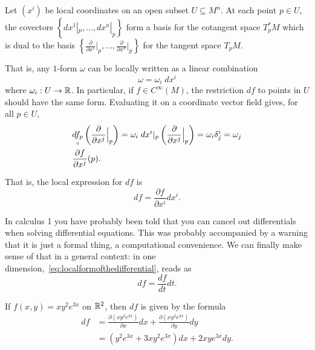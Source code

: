 \begin{proposition}
	Let $(x^i)$ be local coordinates on an open subset $U\subseteq M^n$.
	At each point $p\in U$, the covectors $\left\{dx^1|_p, \ldots, dx^n|_p\right\}$ form a basis for the cotangent space $T_p^* M$ which is dual to the basis $\left\{\frac{\partial}{\partial x^1}\Big|_p, \ldots, \frac{\partial}{\partial x^n}\Big|_p\right\}$ for the tangent space $T_p M$.
\end{proposition}

That is, any $1$-form $\omega$ can be locally written as a linear combination
\begin{equation}
	\omega = \omega_i\; dx^i
\end{equation}
where $\omega_i:U\to\mathbb{R}$.
In particular, if $f\in C^\infty(M)$, the restriction $df$ to points in $U$ should have the same form.
Evaluating it on a coordinate vector field gives, for all $p\in U$,
\begin{align}
	 & \underset{\shortparallel}{df_p} \left(\frac{\partial}{\partial x^j}\Big|_p\right)
	= \omega_i\; dx^i|_p \left(\frac{\partial}{\partial x^j}\Big|_p\right) =
	\omega_i \delta^i_j = \omega_j                                                       \\
	 & \frac{\partial f}{\partial x^j}(p).
\end{align}

That is, the local expression for $df$ is
\begin{equation}\label{eq:localformofthedifferential}
	df =  \frac{\partial f}{\partial x^i} dx^i.
\end{equation}

\begin{remark}
	In calculus 1 you have probably been told that you can cancel out differentials when solving differential equations.
	This was probably accompanied by a warning that it is just a formal thing, a computational convenience.
	We can finally make sense of that in a general context: in one dimension,~\eqref{eq:localformofthedifferential}, reads as
	\begin{equation}
		d f = \frac{df}{dt}dt.
	\end{equation}
\end{remark}

\begin{example}\label{ex:diff1}
	If $f(x,y) = x y^2 e^{3x}$ on $\mathbb{R}^2$, then $df$ is given by the formula
	\begin{align}
		df
		 & = \frac{\partial (x y^2 e^{3x})}{\partial x} dx + \frac{\partial (x y^2 e^{3x})}{\partial y} dy \\
		 & = (y^2 e^{3x} +3xy^2 e^{3x}) dx + 2xy e^{3x} dy.
	\end{align}
\end{example}

